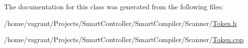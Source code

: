 The documentation for this class was generated from the following files\+:\begin{DoxyCompactItemize}
\item 
/home/vagrant/\+Projects/\+Smart\+Controller/\+Smart\+Compiler/\+Scanner/\hyperlink{_token_8h}{Token.\+h}\item 
/home/vagrant/\+Projects/\+Smart\+Controller/\+Smart\+Compiler/\+Scanner/\hyperlink{_token_8cpp}{Token.\+cpp}\end{DoxyCompactItemize}
